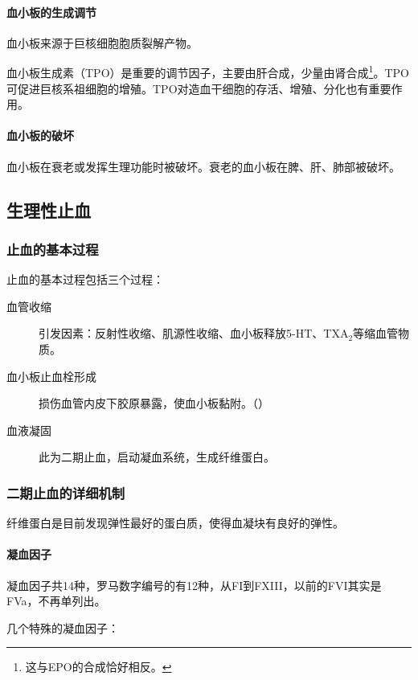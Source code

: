 \paragraph{血小板的生成调节}

血小板来源于巨核细胞胞质裂解产物。

血小板生成素（TPO）是重要的调节因子，主要由肝合成，少量由肾合成\footnote{这与EPO的合成恰好相反。}。TPO可促进巨核系祖细胞的增殖。TPO对造血干细胞的存活、增殖、分化也有重要作用。

\paragraph{血小板的破坏}

血小板在衰老或发挥生理功能时被破坏。衰老的血小板在脾、肝、肺部被破坏。

\subsection{生理性止血}

\subsubsection{止血的基本过程}

止血的基本过程包括三个过程：

\begin{description}
	\item[血管收缩] 引发因素：反射性收缩、肌源性收缩、血小板释放5-HT、TXA$_{2}$等缩血管物质。
	\item[血小板止血栓形成] 损伤血管内皮下胶原暴露，使血小板黏附。（）
	\item[血液凝固] 此为二期止血，启动凝血系统，生成纤维蛋白。
\end{description}


\subsubsection{二期止血的详细机制}

纤维蛋白是目前发现弹性最好的蛋白质，使得血凝块有良好的弹性。

\paragraph{凝血因子}

凝血因子共14种，罗马数字编号的有12种，从FI到FXIII，以前的FVI其实是FVa，不再单列出。

几个特殊的凝血因子：

